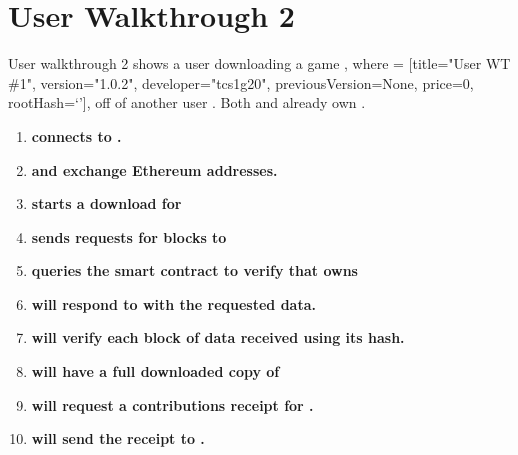 
\section*{User Walkthrough 2}

User walkthrough 2 shows a user  downloading a game , where  = [title="User WT \#1", version="1.0.2", developer="tcs1g20", previousVersion=None, price=0, rootHash=`'], off of another user . Both  and  already own .

\begin{enumerate}
  \item \textbf{ connects to .}

  \item \textbf{ and  exchange Ethereum addresses.}

  \item \textbf{ starts a download for }

  \item \textbf{ sends requests for blocks to }

  \item\textbf{ queries the smart contract to verify that  owns }

  \item \textbf{ will respond to  with the requested data.}

  \item \textbf{ will verify each block of data received using its hash.}

  \item \textbf{ will have a full downloaded copy of }

  \item \textbf{ will request a contributions receipt for .}

  \item \textbf{ will send the receipt to .}
\end{enumerate}